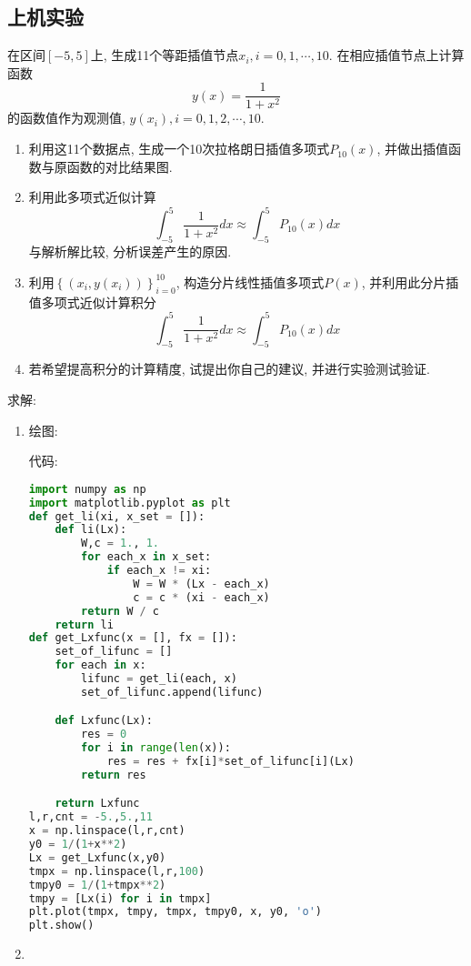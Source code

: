 \documentclass{ctexart}
\begin{document}
\subsection{上机实验}
	在区间$\left[-5,5\right]$上, 生成11个等距插值节点$x_i, i=0,1,\cdots,10$. 在相应插值节点上计算函数
	\begin{equation}
		y\left(x\right) = \frac{1}{1+x^2}
	\end{equation}
	的函数值作为观测值, $y\left(x_i\right),i=0,1,2,\cdots,10$.
	\begin{enumerate}
		\item 利用这11个数据点, 生成一个10次拉格朗日插值多项式$P_{10}\left(x\right)$, 并做出插值函数与原函数的对比结果图.
		\item 利用此多项式近似计算
			\begin{equation}
				\int_{-5}^{5}\frac{1}{1+x^2}dx \approx \int_{-5}^{5}P_{10}\left(x\right)dx
			\end{equation}
			与解析解比较, 分析误差产生的原因.
		\item 利用$\left\{\left(x_i, y\left(x_i\right) \right) \right\}_{i=0}^{10}$, 构造分片线性插值多项式$P\left(x\right)$, 并利用此分片插值多项式近似计算积分
			\begin{equation}
				\int_{-5}^{5}\frac{1}{1+x^2}dx \approx \int_{-5}^{5}P_{10}\left(x\right)dx
			\end{equation}
		\item 若希望提高积分的计算精度, 试提出你自己的建议, 并进行实验测试验证.
	\end{enumerate}
	求解:
	\begin{enumerate}
		\item 
		绘图:
		\begin{figure}
			
		\end{figure}
		代码:
		\begin{lstlisting}[language=python]
import numpy as np
import matplotlib.pyplot as plt
def get_li(xi, x_set = []):
    def li(Lx):
        W,c = 1., 1.
        for each_x in x_set:
            if each_x != xi:
                W = W * (Lx - each_x)
                c = c * (xi - each_x)   
        return W / c    
    return li
def get_Lxfunc(x = [], fx = []):
    set_of_lifunc = []
    for each in x:
        lifunc = get_li(each, x)
        set_of_lifunc.append(lifunc)

    def Lxfunc(Lx):
        res = 0
        for i in range(len(x)):
            res = res + fx[i]*set_of_lifunc[i](Lx)
        return res

    return Lxfunc
l,r,cnt = -5.,5.,11
x = np.linspace(l,r,cnt)
y0 = 1/(1+x**2)
Lx = get_Lxfunc(x,y0)
tmpx = np.linspace(l,r,100)
tmpy0 = 1/(1+tmpx**2)
tmpy = [Lx(i) for i in tmpx]
plt.plot(tmpx, tmpy, tmpx, tmpy0, x, y0, 'o')
plt.show()
		\end{lstlisting}
		\item 
	\end{enumerate}
	
\end{document}
